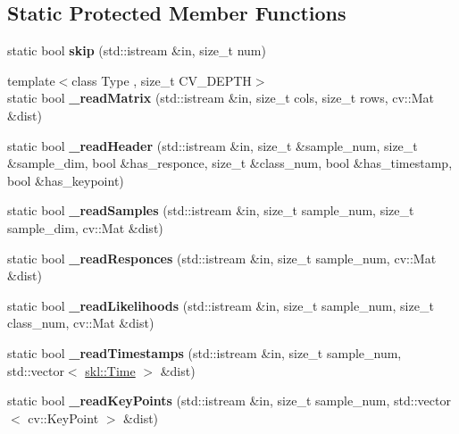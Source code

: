 \subsection*{Static Protected Member Functions}
\begin{DoxyCompactItemize}
\item 
\hypertarget{classskl_1_1_sample_set_reader_ad0a976a1c6ef2958d4a67b4170b5beb4}{}\label{classskl_1_1_sample_set_reader_ad0a976a1c6ef2958d4a67b4170b5beb4} 
static bool {\bfseries skip} (std\+::istream \&in, size\+\_\+t num)
\item 
\hypertarget{classskl_1_1_sample_set_reader_a4a074f7194e0f824741d412e0afeb8a9}{}\label{classskl_1_1_sample_set_reader_a4a074f7194e0f824741d412e0afeb8a9} 
{\footnotesize template$<$class Type , size\+\_\+t C\+V\+\_\+\+D\+E\+P\+TH$>$ }\\static bool {\bfseries \+\_\+read\+Matrix} (std\+::istream \&in, size\+\_\+t cols, size\+\_\+t rows, cv\+::\+Mat \&dist)
\item 
\hypertarget{classskl_1_1_sample_set_reader_ae3fc1347c59fde0c745df2556b14dea0}{}\label{classskl_1_1_sample_set_reader_ae3fc1347c59fde0c745df2556b14dea0} 
static bool {\bfseries \+\_\+read\+Header} (std\+::istream \&in, size\+\_\+t \&sample\+\_\+num, size\+\_\+t \&sample\+\_\+dim, bool \&has\+\_\+responce, size\+\_\+t \&class\+\_\+num, bool \&has\+\_\+timestamp, bool \&has\+\_\+keypoint)
\item 
\hypertarget{classskl_1_1_sample_set_reader_ab2f7b9adc5ae92faaacdae5feb70e3d9}{}\label{classskl_1_1_sample_set_reader_ab2f7b9adc5ae92faaacdae5feb70e3d9} 
static bool {\bfseries \+\_\+read\+Samples} (std\+::istream \&in, size\+\_\+t sample\+\_\+num, size\+\_\+t sample\+\_\+dim, cv\+::\+Mat \&dist)
\item 
\hypertarget{classskl_1_1_sample_set_reader_ac11cc10fb6b555d2c42ad04f33e44e3b}{}\label{classskl_1_1_sample_set_reader_ac11cc10fb6b555d2c42ad04f33e44e3b} 
static bool {\bfseries \+\_\+read\+Responces} (std\+::istream \&in, size\+\_\+t sample\+\_\+num, cv\+::\+Mat \&dist)
\item 
\hypertarget{classskl_1_1_sample_set_reader_a3a425080b0d924db60395c8f12e2b1d9}{}\label{classskl_1_1_sample_set_reader_a3a425080b0d924db60395c8f12e2b1d9} 
static bool {\bfseries \+\_\+read\+Likelihoods} (std\+::istream \&in, size\+\_\+t sample\+\_\+num, size\+\_\+t class\+\_\+num, cv\+::\+Mat \&dist)
\item 
\hypertarget{classskl_1_1_sample_set_reader_a8b2d035748ce4f07b670be3f1ef615d5}{}\label{classskl_1_1_sample_set_reader_a8b2d035748ce4f07b670be3f1ef615d5} 
static bool {\bfseries \+\_\+read\+Timestamps} (std\+::istream \&in, size\+\_\+t sample\+\_\+num, std\+::vector$<$ \hyperlink{classskl_1_1_time}{skl\+::\+Time} $>$ \&dist)
\item 
\hypertarget{classskl_1_1_sample_set_reader_a079d6f3707a991c7778491fbda7ceac1}{}\label{classskl_1_1_sample_set_reader_a079d6f3707a991c7778491fbda7ceac1} 
static bool {\bfseries \+\_\+read\+Key\+Points} (std\+::istream \&in, size\+\_\+t sample\+\_\+num, std\+::vector$<$ cv\+::\+Key\+Point $>$ \&dist)
\end{DoxyCompactItemize}


